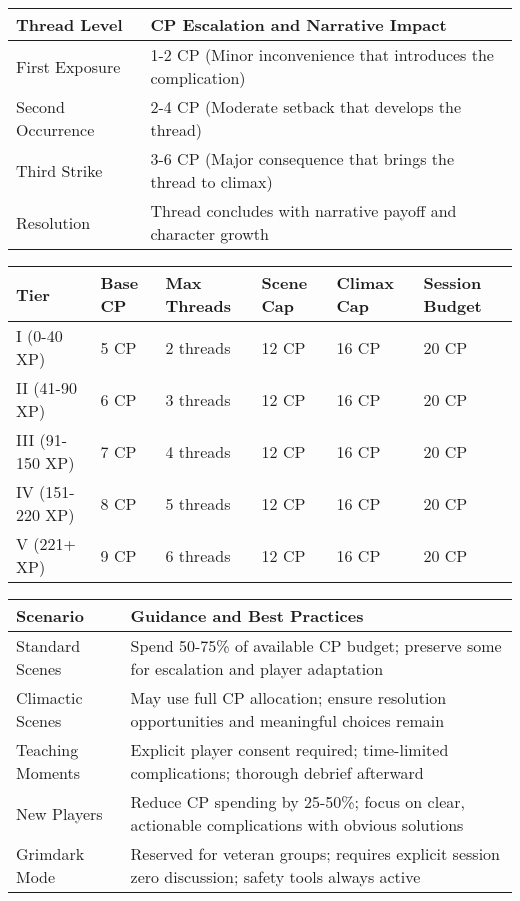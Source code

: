 \begin{fatebox}
\begin{tabularx}{\textwidth}{lX}
\toprule
\textbf{Thread Level} & \textbf{CP Escalation and Narrative Impact} \\
\midrule
First Exposure & 1-2 CP (Minor inconvenience that introduces the complication) \\
Second Occurrence & 2-4 CP (Moderate setback that develops the thread) \\
Third Strike & 3-6 CP (Major consequence that brings the thread to climax) \\
Resolution & Thread concludes with narrative payoff and character growth \\
\bottomrule
\end{tabularx}
\end{fatebox}

\begin{fatebox}
\begin{tabularx}{\textwidth}{lXXXXX}
\toprule
\textbf{Tier} & \textbf{Base CP} & \textbf{Max Threads} & \textbf{Scene Cap} & \textbf{Climax Cap} & \textbf{Session Budget} \\
\midrule
I (0-40 XP) & 5 CP & 2 threads & 12 CP & 16 CP & 20 CP \\
II (41-90 XP) & 6 CP & 3 threads & 12 CP & 16 CP & 20 CP \\
III (91-150 XP) & 7 CP & 4 threads & 12 CP & 16 CP & 20 CP \\
IV (151-220 XP) & 8 CP & 5 threads & 12 CP & 16 CP & 20 CP \\
V (221+ XP) & 9 CP & 6 threads & 12 CP & 16 CP & 20 CP \\
\bottomrule
\end{tabularx}
\end{fatebox}

\begin{fatebox}
\begin{tabularx}{\textwidth}{lX}
\toprule
\textbf{Scenario} & \textbf{Guidance and Best Practices} \\
\midrule
Standard Scenes & Spend 50-75\% of available CP budget; preserve some for escalation and player adaptation \\
Climactic Scenes & May use full CP allocation; ensure resolution opportunities and meaningful choices remain \\
Teaching Moments & Explicit player consent required; time-limited complications; thorough debrief afterward \\
New Players & Reduce CP spending by 25-50\%; focus on clear, actionable complications with obvious solutions \\
Grimdark Mode & Reserved for veteran groups; requires explicit session zero discussion; safety tools always active \\
\bottomrule
\end{tabularx}
\end{fatebox}

